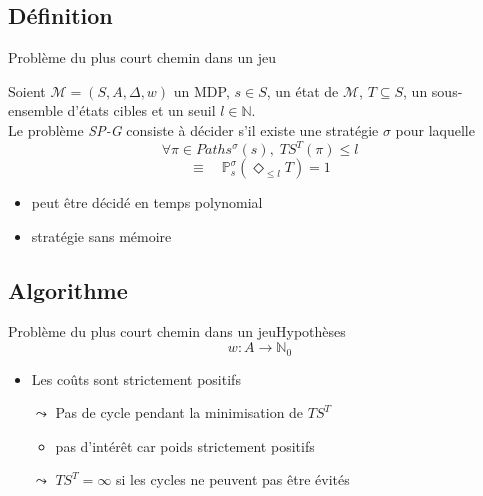 \documentclass[compress]{beamer}
\theoremstyle{theorem}%
\begin{document}
\subsection{Définition}
\begin{frame}{Problème du plus court chemin dans un jeu}
  \begin{definition}[SP-G]
    Soient $\mathcal{M} = (S, A, \Delta, w)$ un MDP, $s \in S$, un état de $\mathcal{M}$, $T \subseteq S$, un sous-ensemble d'états cibles et un seuil $l \in \mathbb{N}$. \\
    Le problème \textit{\color{fibeamer@orange}SP-G} consiste à décider s'il existe une stratégie $\sigma$ pour laquelle
    \[
      \forall \pi \in Paths^\sigma(s), \; TS^T(\pi) \leq l
    \]
    \[
      \equiv \quad \mathbb{P}_s^\sigma(\Diamond_{\leq l} T) = 1
    \]
  \end{definition}
  \begin{itemize}
    \item peut être décidé en temps polynomial
    \item stratégie sans mémoire
  \end{itemize}
\end{frame}

\subsection{Algorithme}
\begin{frame}{Problème du plus court chemin dans un jeu}{Hypothèses}
\[ w : A \rightarrow \mathbb{N}_0 \]
  \begin{itemize}
    \item Les coûts sont strictement positifs
    \item[$\leadsto$] Pas de cycle pendant la minimisation de $TS^T$
    \begin{itemize}
      \item pas d'intérêt car poids strictement positifs
    \end{itemize}
    \item[$\leadsto$] \alert{$TS^T = \infty$ si les cycles ne peuvent pas être évités}
  \end{itemize}
\end{frame}
\end{document}
